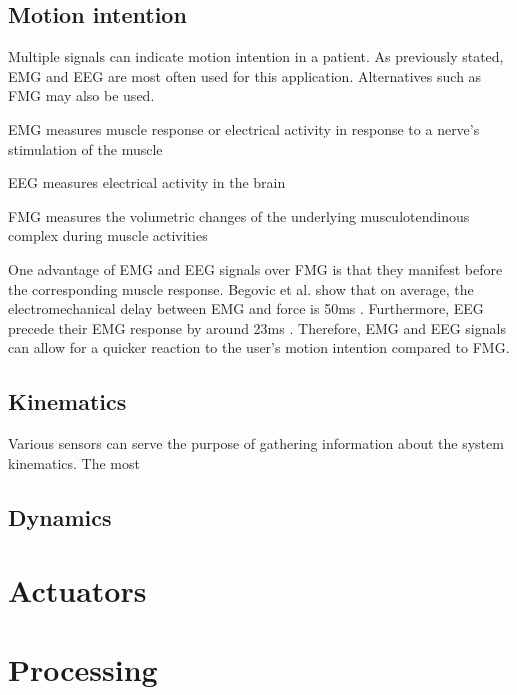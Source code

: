 \subsection{Motion intention}
Multiple signals can indicate motion intention in a patient. As previously stated, 
EMG and EEG are most often used for this application. Alternatives such as FMG may 
also be used.  
\begin{IEEEitemize}
\item EMG measures muscle response or electrical activity in response to a nerve's 
stimulation of the muscle
\item EEG measures electrical activity in the brain
\item FMG measures the volumetric changes of the underlying musculotendinous complex 
during muscle activities \cite{jiang_exploration_2017}
\end{IEEEitemize}
One advantage of EMG and EEG signals over FMG is that they manifest before the 
corresponding muscle response. Begovic et al. show that on average, the electromechanical 
delay between EMG and force is 50ms \cite{begovic_detection_2014}. Furthermore, 
EEG precede their EMG response by around 23ms \cite{xu_delay_2016}. Therefore, 
EMG and EEG signals can allow for a quicker reaction to the user's motion intention 
compared to FMG. 
\subsection{Kinematics}
Various sensors can serve the purpose of gathering information about the system 
kinematics. The most 

\subsection{Dynamics}

\section{Actuators}

\section{Processing}
